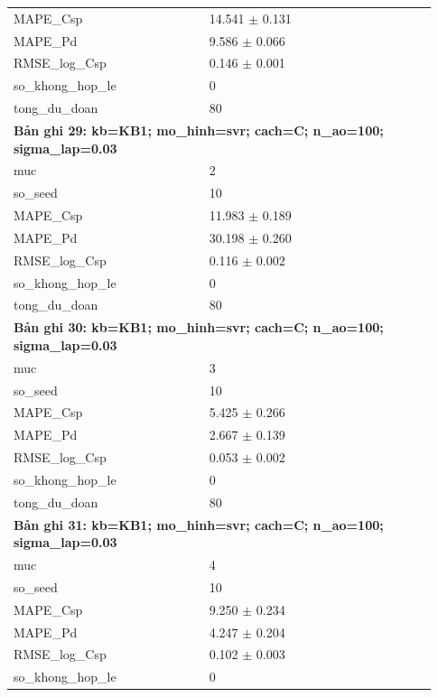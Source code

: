 \begin{longtable}{p{0.43\linewidth}p{0.50\linewidth}}
MAPE\_\allowbreak Csp & 14.541 $\pm$ 0.131 \\
MAPE\_\allowbreak Pd & 9.586 $\pm$ 0.066 \\
RMSE\_\allowbreak log\_\allowbreak Csp & 0.146 $\pm$ 0.001 \\
so\_\allowbreak khong\_\allowbreak hop\_\allowbreak le & 0 \\
tong\_\allowbreak du\_\allowbreak doan & 80 \\
\midrule
\multicolumn{2}{p{0.95\linewidth}}{\textbf{Bản ghi 29: kb=KB1; mo\_hinh=svr; cach=C; n\_ao=100; sigma\_lap=0.03}} \\
muc & 2 \\
so\_\allowbreak seed & 10 \\
MAPE\_\allowbreak Csp & 11.983 $\pm$ 0.189 \\
MAPE\_\allowbreak Pd & 30.198 $\pm$ 0.260 \\
RMSE\_\allowbreak log\_\allowbreak Csp & 0.116 $\pm$ 0.002 \\
so\_\allowbreak khong\_\allowbreak hop\_\allowbreak le & 0 \\
tong\_\allowbreak du\_\allowbreak doan & 80 \\
\midrule
\multicolumn{2}{p{0.95\linewidth}}{\textbf{Bản ghi 30: kb=KB1; mo\_hinh=svr; cach=C; n\_ao=100; sigma\_lap=0.03}} \\
muc & 3 \\
so\_\allowbreak seed & 10 \\
MAPE\_\allowbreak Csp & 5.425 $\pm$ 0.266 \\
MAPE\_\allowbreak Pd & 2.667 $\pm$ 0.139 \\
RMSE\_\allowbreak log\_\allowbreak Csp & 0.053 $\pm$ 0.002 \\
so\_\allowbreak khong\_\allowbreak hop\_\allowbreak le & 0 \\
tong\_\allowbreak du\_\allowbreak doan & 80 \\
\midrule
\multicolumn{2}{p{0.95\linewidth}}{\textbf{Bản ghi 31: kb=KB1; mo\_hinh=svr; cach=C; n\_ao=100; sigma\_lap=0.03}} \\
muc & 4 \\
so\_\allowbreak seed & 10 \\
MAPE\_\allowbreak Csp & 9.250 $\pm$ 0.234 \\
MAPE\_\allowbreak Pd & 4.247 $\pm$ 0.204 \\
RMSE\_\allowbreak log\_\allowbreak Csp & 0.102 $\pm$ 0.003 \\
so\_\allowbreak khong\_\allowbreak hop\_\allowbreak le & 0 \\

\end{longtable}
